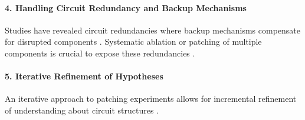 \documentclass[sigconf,authoryear]{acmart}
\begin{document}
  \paragraph{4. Handling Circuit Redundancy and Backup Mechanisms}
  Studies have revealed circuit redundancies where backup mechanisms compensate for disrupted components \citep{wang2022interpretabilitywildcircuitindirect, hanna2023doesgpt2computegreaterthan}. Systematic ablation or patching of multiple components is crucial to expose these redundancies \citep{zhang2024bestpracticesactivationpatching}.
  
  \paragraph{5. Iterative Refinement of Hypotheses}
  An iterative approach to patching experiments allows for incremental refinement of understanding about circuit structures \citep{zhang2024bestpracticesactivationpatching}.
  
\end{document}
